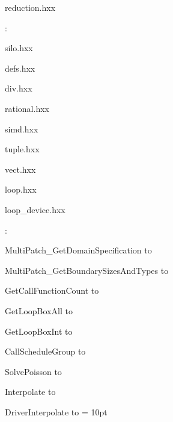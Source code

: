 reduction.hxx
\vspace{2mm}

: 

silo.hxx

defs.hxx

div.hxx

rational.hxx

simd.hxx

tuple.hxx

vect.hxx

loop.hxx

loop\_device.hxx
\vspace{2mm}

: 



MultiPatch\_GetDomainSpecification to 

MultiPatch\_GetBoundarySizesAndTypes to 

GetCallFunctionCount to 

GetLoopBoxAll to 

GetLoopBoxInt to 

CallScheduleGroup to 

SolvePoisson to 

Interpolate to 

DriverInterpolate to 
\vspace{2mm}\parskip = 10pt 
